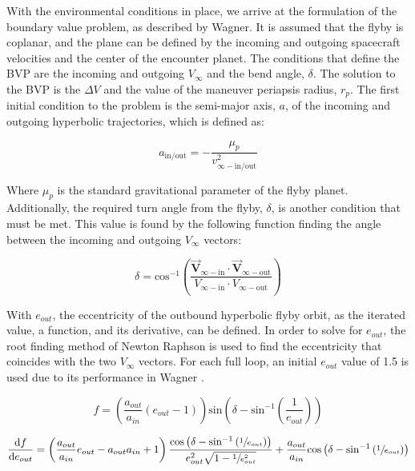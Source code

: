 \documentclass[letterpaper, preprint, paper,11pt]{AAS}	%
\begin{document}
With the environmental conditions in place, we arrive at the formulation of the boundary value problem, as described by Wagner\cite{Wagner2015}. It is assumed that the flyby is coplanar, and the plane can be defined by the incoming and outgoing spacecraft velocities and the center of the encounter planet. The conditions that define the BVP are the incoming and outgoing $V_\infty$ and the bend angle, $\delta$. The solution to the BVP is the $\Delta V$ and the value of the maneuver periapsis radius, $r_p$. The first initial condition to the problem is the semi-major axis, $a$, of the incoming and outgoing hyperbolic trajectories, which is defined as:

\begin{equation}
    a_\text{in/out} = -\frac{\mu_p}{v^2_{\infty-\text{in/out}}}
\end{equation}

Where $\mu_p$ is the standard gravitational parameter of the flyby planet. Additionally, the required turn angle from the flyby, $\delta$, is another condition that must be met. This value is found by the following function finding the angle between the incoming and outgoing $V_\infty$ vectors:

\begin{equation}
    \delta = \text{cos}^{-1}\left(\frac{ \vec{\textbf{V}}_{\infty-\text{in}} \cdot \vec{\textbf{V}}_{\infty-\text{out}} }{ V_{\infty-\text{in}} \cdot V_{\infty-\text{out}} }\right)
\end{equation}

With $e_{out}$, the eccentricity of the outbound hyperbolic flyby orbit, as the iterated value, a function, and its derivative, can be defined. In order to solve for $e_{out}$, the root finding method of Newton Raphson is used to find the eccentricity that coincides with the two $V_\infty$ vectors. For each full loop, an initial $e_{out}$ value of 1.5 is used due to its performance in Wagner \cite{Wagner2015}.

\begin{equation}
    f = \left( \frac{a_{out}}{a_{in}} (e_{out} - 1) \right) \text{sin} \left( \delta - \text{sin}^{-1} \left( \frac{1}{e_{out}} \right) \right)
\end{equation}

\begin{equation}
    \frac{\text{d}f}{\text{d}e_{out}} = \left( \frac{a_{out}}{a_{in}}e_{out} - a_{out}{a_{in}} + 1 \right) \frac{ \text{cos}\left( \delta - \text{sin}^{-1} \left( \sfrac{1}{e_{out}} \right) \right) }{ e_{out}^{2} \sqrt{1 - \sfrac{1}{e_{out}^{2}} } } + \frac{a_{out}}{a_{in}}\text{cos}\left( \delta - \text{sin}^{-1} \left( \sfrac{1}{e_{out}} \right) \right)
\end{equation}
\end{document}
